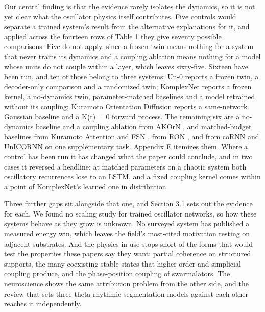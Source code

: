 \documentclass[a4paper,fleqn]{cas-sc}
\begin{document}
Our central finding is that the evidence rarely isolates the dynamics,
so it is not yet clear what the oscillator physics itself contributes.
Five controls would separate a trained system's result from the
alternative explanations for it, and applied across the fourteen rows of
Table 1 they give seventy possible comparisons. Five do not apply, since
a frozen twin means nothing for a system that never trains its dynamics
and a coupling ablation means nothing for a model whose units do not
couple within a layer, which leaves sixty-five. Sixteen have been run,
and ten of those belong to three systems: Un-0 \citep{un-0} reports a
frozen twin, a decoder-only comparison and a randomized twin; KomplexNet
\citep{muzellec2025} reports a frozen kernel, a no-dynamics twin,
parameter-matched baselines and a model retrained without its coupling;
Kuramoto Orientation Diffusion \citep{kuramoto-orientation-diffusion}
reports a same-network Gaussian baseline and a K(t) = 0 forward process.
The remaining six are a no-dynamics baseline and a coupling ablation
from AKOrN \citep{akorn}, and matched-budget baselines from Kuramoto
Attention \citep{kuramoto-attention} and FSN \citep{nunley2026}, from
RON \citep{ceni2024}, and from coRNN \citep{rusch2021} and UnICORNN
\citep{unicornn} on one supplementary task. \hyperref[sec-E]{Appendix E}
itemizes them. Where a control has been run it has changed what the
paper could conclude, and in two cases it reversed a headline: at
matched parameters on a chaotic system both oscillatory recurrences lose
to an LSTM, and a fixed coupling kernel comes within a point of
KomplexNet's learned one in distribution.

Three further gaps sit alongside that one, and
\hyperref[sec-3-1]{Section 3.1} sets out the evidence for each. We found
no scaling study for trained oscillator networks, so how these systems
behave as they grow is unknown. No surveyed system has published a
measured energy win, which leaves the field's most-cited motivation
resting on adjacent substrates. And the physics in use stops short of
the forms that would test the properties these papers say they want:
partial coherence on structured supports, the many coexisting stable
states that higher-order and simplicial coupling produce, and the
phase-position coupling of swarmalators. The neuroscience shows the same
attribution problem from the other side, and the review that sets three
theta-rhythmic segmentation models against each other
\citep{dogonasheva2026} reaches it independently.
\end{document}
